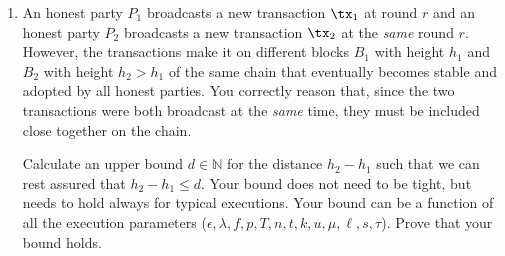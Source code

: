 \begin{problems}
\begin{enumerate}
            \item An honest party $P_1$ broadcasts a new transaction $\tx_1$ at round $r$
                and an honest party $P_2$ broadcasts a new transaction $\tx_2$ at the
                \emph{same} round $r$. However, the transactions make it on different blocks
                $B_1$ with height $h_1$ and $B_2$ with height $h_2 > h_1$ of the same chain
                that eventually becomes stable and adopted by all honest parties. You
                correctly reason that, since the two transactions were both broadcast at the
                \emph{same} time, they must be included close together on the chain.

                Calculate an upper bound $d \in \mathbb{N}$ for the distance $h_2 - h_1$
                such that we can rest assured that $h_2 - h_1 \leq d$. Your bound does not
                need to be tight, but needs to hold always for typical executions. Your
                bound can be a function of all the execution parameters ($\epsilon, \lambda,
                f, p, T, n, t, k, u, \mu, \ell, s, \tau$). Prove that your bound holds.
            \end{enumerate}


\end{problems}
